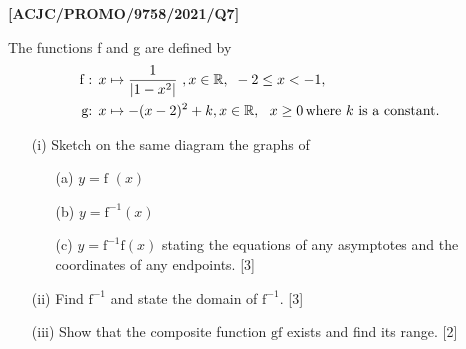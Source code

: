 \item \textbf{{[}ACJC/PROMO/9758/2021/Q7{]}}

The functions f and g are defined by 
\begin{align*}
\text{f : }x & \mapsto\frac{1}{\left|1-x^{2}\right|}\ ,x\in\mathbb{R},\text{ }-2\le x<-1,\\
\text{g: }x & \mapsto-(x-2)^{2}+k,x\in\mathbb{R},\text{ }\ x\ge0\,\text{where \ensuremath{k} is a constant}.
\end{align*}

\begin{enumerate}
\item[(i)]  Sketch on the same diagram the graphs of 
\begin{enumerate}
\item[(a)]  $y=\text{f }\left(x\right)$
\item[(b)]  $y=\text{f}^{-1}\left(x\right)$
\item[(c)]  $y=\text{f}^{-1}\text{f}\left(x\right)$ stating the equations of
any asymptotes and the coordinates of any endpoints. \hfill{} {[}3{]}
\end{enumerate}
\item[(ii)]  Find $\text{f}^{-1}$ and state the domain of $\text{f}^{-1}$.
\hfill{}{[}3{]}
\item[(iii)]  Show that the composite function $\text{gf}$ exists and find its
range. \hfill{}{[}2{]}
\end{enumerate}